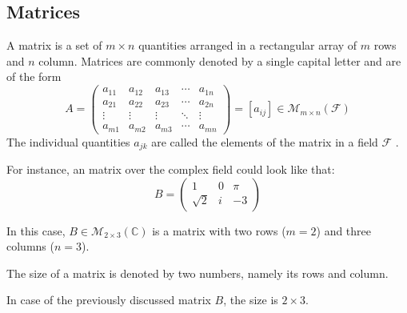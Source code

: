 \subsection{Matrices}\label{subsec-matrices}

\begin{definition}\label{def-matrices}
	A matrix is a set of $m \times n$ quantities arranged in a rectangular array
	of $m$ rows and $n$ column. Matrices are commonly denoted by a single capital
	letter and are of the form
	\begin{equation}\label{eq-general-matrix}
		A = \begin{pmatrix}
			a_{11} & a_{12} & a_{13} & \cdots & a_{1n} \\
			a_{21} & a_{22} & a_{23} & \cdots & a_{2n} \\
			\vdots & \vdots & \vdots & \ddots & \vdots \\
			a_{m1} & a_{m2} & a_{m3} & \cdots & a_{mn}
		\end{pmatrix}=[a_{ij}]\in\mathcal{M}_{m \times n}(\mathcal{F})
	\end{equation}
	The individual quantities $a_{jk}$ are called the elements of the matrix
	in a field $\mathcal{F}$ \cite[p.297]{stephenson1998}.
\end{definition}

\begin{exm}
	For instance, an matrix over the complex field could look like that:
	\begin{equation*}
		B = \begin{pmatrix}
			1        & 0 & \pi \\
			\sqrt{2} & i & -3
		\end{pmatrix}
	\end{equation*}
\end{exm}

\begin{exm}
	In this case, $B\in\mathcal{M}_{2 \times 3}(\mathbb{C})$ is a matrix with
	two rows ($m = 2$) and three columns ($n = 3$).
\end{exm}

\begin{definition}\label{def-size-of-matrix}
	The size of a matrix is denoted by two numbers, namely its rows and
	column.
\end{definition}

\begin{exm}
	In case of the previously discussed matrix $B$, the size is $2 \times 3$.
\end{exm}

